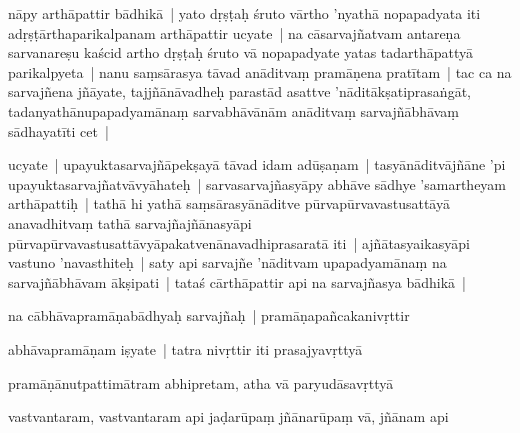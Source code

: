 \documentclass[article,12pt,a4paper]{memoir}%
\newcounter{parCount}
\begin{document}
	  
	  \pstart \leavevmode%
	\label{thakur75-28.6}nāpy arthāpattir bādhikā | yato dṛṣṭaḥ śruto vārtho 'nyathā nopapadyata iti adṛṣṭārthaparikalpanam arthāpattir ucyate | na cāsarvajñatvam antareṇa sarvanareṣu kaścid artho dṛṣṭaḥ śruto vā nopapadyate yatas tadarthāpattyā parikalpyeta | nanu saṃsārasya tāvad anāditvaṃ pramāṇena pratītam | tac ca na sarvajñena jñāyate, tajjñānāvadheḥ parastād asattve 'nāditākṣatiprasaṅgāt, tadanyathānupapadyamānaṃ sarvabhāvānām anāditvaṃ sarvajñābhāvaṃ sādhayatīti cet | 
	{}
	\pend%
      

	  
	  \pstart \leavevmode%
	\label{thakur75-28.12}ucyate | upayuktasarvajñāpekṣayā tāvad idam adūṣaṇam | tasyānāditvājñāne 'pi upayuktasarvajñatvāvyāhateḥ | sarvasarvajñasyāpy abhāve sādhye 'samartheyam arthāpattiḥ | tathā hi yathā saṃsārasyānāditve pūrvapūrvavastusattāyā anavadhitvaṃ tathā sarvajñajñānasyāpi pūrvapūrvavastusattāvyāpakatvenānavadhiprasaratā iti | ajñātasyaikasyāpi vastuno 'navasthiteḥ | saty api sarvajñe 'nāditvam upapadyamānaṃ na sarvajñābhāvam ākṣipati | tataś cārthāpattir api na sarvajñasya bādhikā | 
	{}
	\pend%
      

	  
	  \pstart \leavevmode%
	\label{thakur75-28.18}na cābhāvapramāṇabādhyaḥ sarvajñaḥ | pramāṇapañcakanivṛttir 
	{}
	\pend%
      

	  
	  \pstart \leavevmode%
	abhāvapramāṇam iṣyate | tatra nivṛttir iti prasajyavṛttyā 
	{}
	\pend%
      

	  
	  \pstart \leavevmode%
	pramāṇānutpattimātram abhipretam, atha vā paryudāsavṛttyā 
	{}
	\pend%
      

	  
	  \pstart \leavevmode%
	vastvantaram, vastvantaram api jaḍarūpaṃ jñānarūpaṃ vā, jñānam api 
	{}
	\pend%
      
\end{document}
